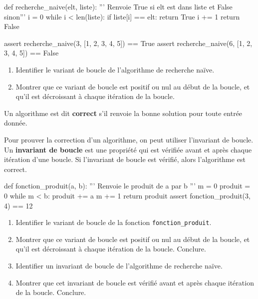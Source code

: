 \begin{exercice_cours}{}
	\begin{CodePythontexAlt}[TaillePolice=\normalsize, Largeur=1\linewidth,Centre,PremLigne=1]{}
		def recherche_naive(elt, liste):
			''' Renvoie True si elt est dans liste et False sinon'''
			i = 0
			while i < len(liste):
				if liste[i] == elt:
					return True
				i += 1
			return False
			
		assert recherche_naive(3, [1, 2, 3, 4, 5]) == True
		assert recherche_naive(6, [1, 2, 3, 4, 5]) == False
		\end{CodePythontexAlt}
		\begin{enumerate}
			\item Identifier le variant de boucle de l'algorithme de recherche naïve.
			\item Montrer que ce variant de boucle est positif ou nul au début de la boucle, et qu'il est décroissant à chaque itération de la boucle.
		\end{enumerate}
\end{exercice_cours}


		\begin{definition}{}
	Un algorithme est dit \textbf{correct} s'il renvoie la bonne solution pour toute entrée donnée. 

	Pour prouver la correction d'un algorithme, on peut utiliser l'invariant de boucle. Un \textbf{invariant de boucle} est une propriété qui est vérifiée avant et après chaque itération d'une boucle. Si l'invariant de boucle est vérifié, alors l'algorithme est correct.
\end{definition}

\begin{exercice_cours}{}
	\begin{CodePythontexAlt}[TaillePolice=\normalsize, Largeur=1\linewidth,Centre,PremLigne=1]{}
	def fonction_produit(a, b):
		''' Renvoie le produit de a par b '''
		m = 0
		produit = 0
		while m < b:
			produit += a
			m += 1
		return produit
	assert fonction_produit(3, 4) == 12
	
	\end{CodePythontexAlt}
		\begin{enumerate}
			\item Identifier le variant de boucle de la fonction \texttt{fonction\_produit}.
			\item Montrer que ce variant de boucle est positif ou nul au début de la boucle, et qu'il est décroissant à chaque itération de la boucle. Conclure.			\item Identifier un invariant de boucle de l'algorithme de recherche naïve.
			\item Montrer que cet invariant de boucle est vérifié avant et après chaque itération de la boucle. Conclure.
		\end{enumerate}
\end{exercice_cours}

